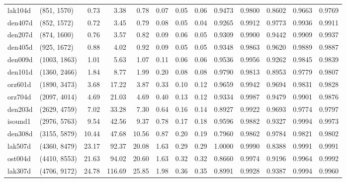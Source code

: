 \begin{tabular}{llrrrrrrrrrrr}
 lak104d &  (851, 1570) &  0.73 &   3.38 &  0.78 & 0.07 &  0.05 &   0.06 &   0.9473 &   0.9800 &    0.8602 &     0.9663 &      0.9769 \\
 den407d &  (852, 1572) &  0.72 &   3.45 &  0.79 & 0.08 &  0.05 &   0.04 &   0.9265 &   0.9912 &    0.9773 &     0.9936 &      0.9911 \\
 den207d &  (874, 1600) &  0.76 &   3.57 &  0.82 & 0.09 &  0.06 &   0.05 &   0.9309 &   0.9900 &    0.9442 &     0.9909 &      0.9937 \\
 den405d &  (925, 1672) &  0.88 &   4.02 &  0.92 & 0.09 &  0.05 &   0.05 &   0.9348 &   0.9863 &    0.9620 &     0.9889 &      0.9887 \\
 den009d & (1003, 1863) &  1.01 &   5.63 &  1.07 & 0.11 &  0.06 &   0.06 &   0.9536 &   0.9956 &    0.9262 &     0.9845 &      0.9839 \\
 den101d & (1360, 2466) &  1.84 &   8.77 &  1.99 & 0.20 &  0.08 &   0.08 &   0.9790 &   0.9813 &    0.8953 &     0.9779 &      0.9807 \\
 orz601d & (1890, 3473) &  3.68 &  17.22 &  3.87 & 0.33 &  0.10 &   0.12 &   0.9659 &   0.9942 &    0.9694 &     0.9831 &      0.9828 \\
 orz704d & (2097, 4014) &  4.69 &  21.03 &  4.69 & 0.40 &  0.13 &   0.12 &   0.9334 &   0.9987 &    0.9479 &     0.9901 &      0.9876 \\
 den203d & (2629, 4759) &  7.02 &  33.28 &  7.30 & 0.64 &  0.16 &   0.14 &   0.8927 &   0.9922 &    0.9693 &     0.9774 &      0.9797 \\
 isound1 & (2976, 5763) &  9.54 &  42.56 &  9.37 & 0.78 &  0.17 &   0.18 &   0.9596 &   0.9882 &    0.9327 &     0.9994 &      0.9973 \\
 den308d & (3155, 5879) & 10.44 &  47.68 & 10.56 & 0.87 &  0.20 &   0.19 &   0.7960 &   0.9862 &    0.9784 &     0.9821 &      0.9802 \\
 lak507d & (4360, 8479) & 23.17 &  92.37 & 20.08 & 1.63 &  0.29 &   0.29 &   1.0000 &   0.9990 &    0.8388 &     0.9991 &      0.9991 \\
 ost004d & (4410, 8553) & 21.63 &  94.02 & 20.60 & 1.63 &  0.32 &   0.32 &   0.8660 &   0.9974 &    0.9196 &     0.9964 &      0.9992 \\
 lak307d & (4706, 9172) & 24.78 & 116.69 & 25.85 & 1.98 &  0.36 &   0.35 &   0.8991 &   0.9928 &    0.9387 &     0.9994 &      0.9960 \\
\bottomrule
\end{tabular}
